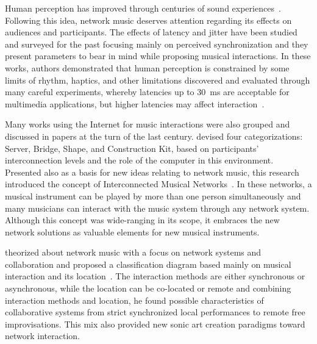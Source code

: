Human perception has improved through centuries of sound experiences~\citep{Jourdain1997music}.
Following this idea, network music deserves attention regarding its effects on audiences and participants.
The effects of latency and jitter have been studied and surveyed for the past focusing mainly on perceived synchronization and they present parameters to bear in mind while proposing musical interactions.
In these works, authors demonstrated that human perception is constrained by some limits of rhythm, haptics, and other limitations discovered and evaluated through many careful experiments, whereby latencies up to 30~ms are acceptable for multimedia applications, but higher latencies may affect interaction~\citep{Schuett2002effects,Lago2004thequest,Rottondi2016overview}.

Many works using the Internet for music interactions were also grouped and discussed in papers at the turn of the last century.
\cite{Weinberg2003} devised four categorizations: Server, Bridge, Shape, and Construction Kit, based on participants' interconnection levels and the role of the computer in this environment.
Presented also as a basis for new ideas relating to network music, this research introduced the concept of Interconnected Musical Networks~\citep{Weinberg2005interconnected}. 
In these networks, a musical instrument can be played by more than one person simultaneously and many musicians can interact with the music system through any network system.
Although this concept was wide-ranging in its scope, it embraces the new network solutions as valuable elements for new musical instruments.

 theorized about network music with a focus on network systems and collaboration and proposed a classification diagram based mainly on musical interaction and its location~\citep{Barbosa2003dispacedsoundscapes}.
The interaction methods are either synchronous or asynchronous, while the location can be co-located or remote and combining interaction methods and location, he found possible characteristics of collaborative systems from strict synchronized local performances to remote free improvisations.
This mix also provided new sonic art creation paradigms toward network interaction.

